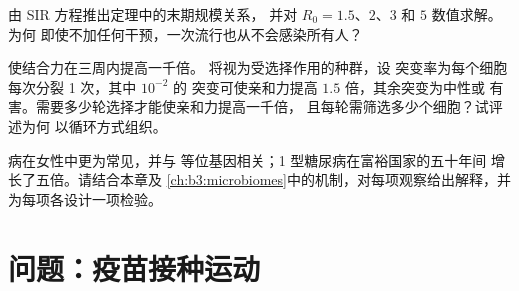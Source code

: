 \begin{exercise}[$\star\star\star$]\label{exo:b3:adaptive-immunity:10}
由 SIR 方程推出定理中的末期规模关系，
并对 $R_{0} = 1.5$、$2$、$3$ 和 $5$ 数值求解。为何
即使不加任何干预，一次流行也从不会感染所有人？
\end{exercise}

\begin{exercise}[$\star\star\star$]\label{exo:b3:adaptive-immunity:11}
使结合力在三周内提高一千倍。
将视为受选择作用的种群，设
突变率为每个细胞每次分裂 1 次，其中 $10^{-2}$ 的
突变可使亲和力提高 $1.5$ 倍，其余突变为中性或
有害。需要多少轮选择才能使亲和力提高一千倍，
且每轮需筛选多少个细胞？试评述为何
以循环方式组织。
\end{exercise}

\begin{exercise}[$\star\star\star$]\label{exo:b3:adaptive-immunity:12}
病在女性中更为常见，并与 
等位基因相关；1 型糖尿病在富裕国家的五十年间
增长了五倍。请结合本章及
\cref{ch:b3:microbiomes}中的机制，对每项观察给出解释，并
为每项各设计一项检验。
\end{exercise}

\section{问题：疫苗接种运动}

